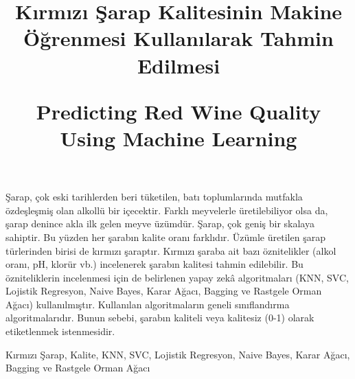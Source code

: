 \documentclass[conference]{IEEEtran}
\begin{document}
\IEEEpubid{\makebox[\columnwidth]{\hfill} \hspace{\columnsep}\makebox[\columnwidth]{}}

\title{Kırmızı Şarap Kalitesinin Makine Öğrenmesi Kullanılarak Tahmin Edilmesi
\\
\*

Predicting Red Wine Quality Using Machine Learning
}
\author{
	
\and
{}
}
\maketitle
\thispagestyle{plain}
\pagestyle{plain}
\begin{ozet}
Şarap, çok eski tarihlerden beri tüketilen, batı toplumlarında mutfakla özdeşleşmiş olan alkollü bir içecektir. Farklı meyvelerle üretilebiliyor olsa da, şarap denince akla ilk gelen meyve üzümdür. Şarap, çok geniş bir skalaya sahiptir. Bu yüzden her şarabın kalite oranı farklıdır. Üzümle üretilen şarap türlerinden birisi de kırmızı şaraptır. Kırmızı şaraba ait bazı öznitelikler (alkol oranı, pH, klorür vb.) incelenerek şarabın kalitesi tahmin edilebilir. Bu özniteliklerin incelenmesi için de belirlenen yapay zekâ algoritmaları (KNN, SVC, Lojistik Regresyon, Naive Bayes, Karar Ağacı, Bagging ve Rastgele Orman Ağacı) kullanılmıştır. Kullanılan algoritmaların geneli sınıflandırma algoritmalarıdır. Bunun sebebi, şarabın kaliteli veya kalitesiz (0-1) olarak etiketlenmek istenmesidir.
\end{ozet}

\begin{IEEEanahtar}
Kırmızı Şarap, Kalite, KNN, SVC, Lojistik Regresyon, Naive Bayes, Karar Ağacı, Bagging ve Rastgele Orman Ağacı
\end{IEEEanahtar}
\end{document}
